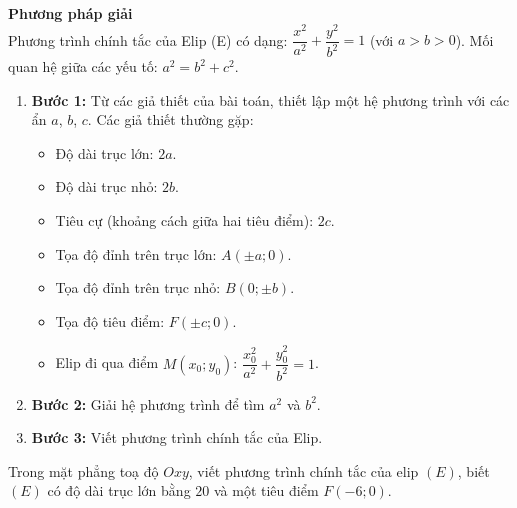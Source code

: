 \begin{dang}
	\textbf{Phương pháp giải}
	\\
	Phương trình chính tắc của Elip (E) có dạng: $\dfrac{x^2}{a^2} + \dfrac{y^2}{b^2} = 1$ (với $a>b>0$).
	Mối quan hệ giữa các yếu tố: $a^2 = b^2 + c^2$.
	\begin{enumerate}
		\item \textbf{Bước 1:} Từ các giả thiết của bài toán, thiết lập một hệ phương trình với các ẩn $a$, $b$, $c$. Các giả thiết thường gặp:
		\begin{itemize}
			\item Độ dài trục lớn: $2a$.
			\item Độ dài trục nhỏ: $2b$.
			\item Tiêu cự (khoảng cách giữa hai tiêu điểm): $2c$.
			\item Tọa độ đỉnh trên trục lớn: $A(\pm a; 0)$.
			\item Tọa độ đỉnh trên trục nhỏ: $B(0; \pm b)$.
			\item Tọa độ tiêu điểm: $F(\pm c; 0)$.
			\item Elip đi qua điểm $M(x_0; y_0)$: $\dfrac{x_0^2}{a^2} + \dfrac{y_0^2}{b^2} = 1$.
		\end{itemize}
		\item \textbf{Bước 2:} Giải hệ phương trình để tìm $a^2$ và $b^2$.
		\item \textbf{Bước 3:} Viết phương trình chính tắc của Elip.
	\end{enumerate}
\end{dang}
\begin{vd}%
	Trong mặt phẳng toạ độ $Oxy$, viết phương trình chính tắc của elip $(E)$, biết $(E)$ có độ dài trục lớn bằng $20$ và một tiêu điểm $F(-6;0)$.
\end{vd}
